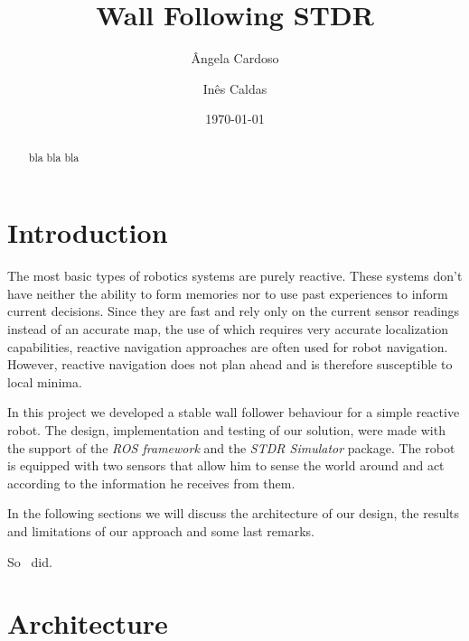 \documentclass[12pt,a4paper,reqno]{article}
\numberwithin{figure}{section}
\numberwithin{equation}{section}
\begin{document}
\title{Wall Following STDR}

\author{\^{A}ngela Cardoso}
\author{In\^{e}s Caldas}
\date{\today}

\maketitle

\begin{abstract}
bla bla bla
\end{abstract}

\tableofcontents

\section{Introduction}

The most basic types of robotics systems are purely reactive. These systems don’t have neither the ability to form memories nor to use past experiences to inform current decisions. Since they are fast and rely only on the current sensor readings instead of an accurate map, the use of which requires very accurate localization capabilities, reactive navigation approaches are often used for robot navigation. However, reactive navigation does not plan ahead and is therefore susceptible to local minima. 

In this project we developed a stable wall follower behaviour for a simple reactive robot. The design, implementation and testing of our solution, were made with the support of the \textit{ROS framework} and the \textit{STDR Simulator} package. The robot is equipped with two sensors that allow him to sense the world around and act according to the information he receives from them. 

In the following sections we will discuss the architecture of our design, the results and limitations of our approach and some last remarks.



So~\cite{Trahtman:2009} did.


\section{Architecture}

\end{document}
